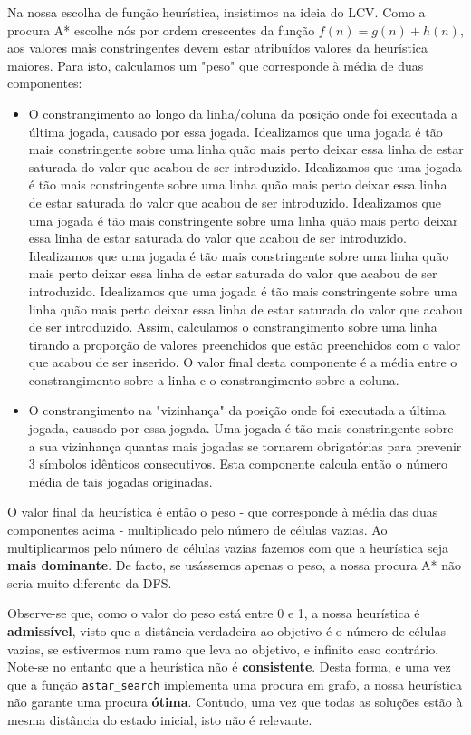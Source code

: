 \documentclass[12pt,a4paper]{article}
\begin{document}
Na nossa escolha de função heurística, insistimos na ideia do LCV.
Como a procura A* escolhe nós por ordem crescentes da função $f(n) = g(n) + h(n)$, aos valores mais constringentes devem estar atribuídos valores da heurística maiores.
Para isto, calculamos um "peso" que corresponde à média de duas componentes:
\begin{itemize}
      \item O constrangimento ao longo da linha/coluna da posição onde foi executada a última jogada, causado por essa jogada.
            Idealizamos que uma jogada é tão mais constringente sobre uma linha quão mais perto deixar essa linha de estar saturada do valor que acabou de ser introduzido.
            Idealizamos que uma jogada é tão mais constringente sobre uma linha quão mais perto deixar essa linha de estar saturada do valor que acabou de ser introduzido.
            Idealizamos que uma jogada é tão mais constringente sobre uma linha quão mais perto deixar essa linha de estar saturada do valor que acabou de ser introduzido.
            Idealizamos que uma jogada é tão mais constringente sobre uma linha quão mais perto deixar essa linha de estar saturada do valor que acabou de ser introduzido.
            Idealizamos que uma jogada é tão mais constringente sobre uma linha quão mais perto deixar essa linha de estar saturada do valor que acabou de ser introduzido.
            Assim, calculamos o constrangimento sobre uma linha tirando a proporção de valores preenchidos que estão preenchidos com o valor que acabou de ser inserido.
            O valor final desta componente é a média entre o constrangimento sobre a linha e o constrangimento sobre a coluna.
      \item O constrangimento na "vizinhança" da posição onde foi executada a última jogada, causado por essa jogada.
            Uma jogada é tão mais constringente sobre a sua vizinhança quantas mais jogadas se tornarem obrigatórias para prevenir 3 símbolos idênticos consecutivos.
            Esta componente calcula então o número média de tais jogadas originadas.
\end{itemize}

O valor final da heurística é então o peso - que corresponde à média das duas componentes acima - multiplicado pelo número de células vazias.
Ao multiplicarmos pelo número de células vazias fazemos com que a heurística seja \textbf{mais dominante}.
De facto, se usássemos apenas o peso, a nossa procura A* não seria muito diferente da DFS.

Observe-se que, como o valor do peso está entre 0 e 1, a nossa heurística é \textbf{admissível}, visto que a distância verdadeira ao objetivo é o número de células vazias, se estivermos num ramo que leva ao objetivo, e infinito caso contrário.
Note-se no entanto que a heurística não é \textbf{consistente}.
Desta forma, e uma vez que a função \texttt{astar\_search} implementa uma procura em grafo, a nossa heurística não garante uma procura \textbf{ótima}.
Contudo, uma vez que todas as soluções estão à mesma distância do estado inicial, isto não é relevante.
\end{document}
